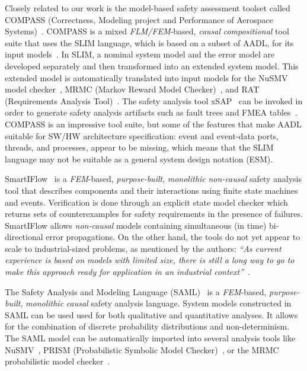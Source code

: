 Closely related to our work is the model-based safety assessment toolset called COMPASS (Correctness, Modeling project and Performance of Aerospace Systems)~\cite{10.1007/978-3-642-04468-7_15}.  COMPASS is a mixed {\em FLM/FEM}-based, {\em causal} {\em compositional} tool suite that uses the SLIM language, which is based on a subset of AADL, for its input models~\cite{5185388, criticalembeddedsystems}. In SLIM, a nominal system model and the error model are developed separately and then transformed into an extended system model.  This extended model is automatically translated into input models for the NuSMV model checker~\cite{Cimatti2000, NuSMV}, MRMC (Markov Reward Model Checker)~\cite{Katoen:2005:MRM:1114692.1115230, MRMC}, and RAT (Requirements Analysis Tool)~\cite{RAT}. The safety analysis tool xSAP~\cite{DBLP:conf/tacas/BittnerBCCGGMMZ16} can be invoked in order to generate safety analysis artifacts such as fault trees and FMEA tables~\cite{compass30toolset}.  COMPASS is an impressive tool suite, but some of the features that make AADL suitable for SW/HW architecture specification: event and event-data ports, threads, and processes, appear to be missing, which means that the SLIM language may not be suitable as a general system design notation (ESM).

SmartIFlow~\cite{info8010007} is a {\em FEM}-based, {\em purpose-built}, {\em monolithic} {\em non-causal} safety analysis tool that describes components and their interactions using finite state machines and events. Verification is done through an explicit state model checker which returns sets of counterexamples for safety requirements in the presence of failures.  SmartIFlow allows {\em non-causal} models containing simultaneous (in time) bi-directional %
error propagations.  On the other hand, the tools do not yet appear to scale to industrial-sized problems, as mentioned by the authors: \textit{``As current experience is based on models with limited size, there is still a long way to go to make this approach ready for application in an industrial context''}~\cite{info8010007}.


The Safety Analysis and Modeling Language (SAML)~\cite{Gudemann:2010:FQQ:1909626.1909813} is a {\em FEM}-based, {\em purpose-built}, {\em monolithic} {\em causal} safety analysis language.  System models constructed in SAML can be used used for both qualitative and quantitative analyses. It allows for the combination of discrete probability distributions and non-determinism. The SAML model can be automatically imported into several analysis tools like NuSMV~\cite{Cimatti2000}, PRISM (Probabilistic Symbolic Model Checker)~\cite{CAV2011:KwNoPa}, or the MRMC probabilistic model checker~\cite{Katoen:2005:MRM:1114692.1115230}. 

